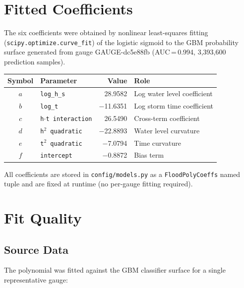 \documentclass[11pt,a4paper]{article}
\begin{document}
\section{Fitted Coefficients}

The six coefficients were obtained by nonlinear least-squares fitting
(\texttt{scipy.optimize.curve\_fit}) of the logistic sigmoid to the GBM
probability surface generated from gauge GAUGE-dc5e88fb (AUC\,=\,0.994,
3,393,600 prediction samples).

\begin{center}
\begin{tabular}{clrl}
\toprule
\textbf{Symbol} & \textbf{Parameter} & \textbf{Value} & \textbf{Role} \\
\midrule
$a$ & \texttt{log\_h\_s} & 28.9582 & Log water level coefficient \\
$b$ & \texttt{log\_t} & $-$11.6351 & Log storm time coefficient \\
$c$ & \texttt{h$\cdot$t interaction} & 26.5490 & Cross-term coefficient \\
$d$ & \texttt{h$^2$ quadratic} & $-$22.8893 & Water level curvature \\
$e$ & \texttt{t$^2$ quadratic} & $-$7.0794 & Time curvature \\
$f$ & \texttt{intercept} & $-$0.8872 & Bias term \\
\bottomrule
\end{tabular}
\end{center}

\noindent All coefficients are stored in \texttt{config/models.py} as a
\texttt{FloodPolyCoeffs} named tuple and are fixed at runtime (no per-gauge
fitting required).

\section{Fit Quality}

\subsection{Source Data}
The polynomial was fitted against the GBM classifier surface for a single
representative gauge:
\end{document}
